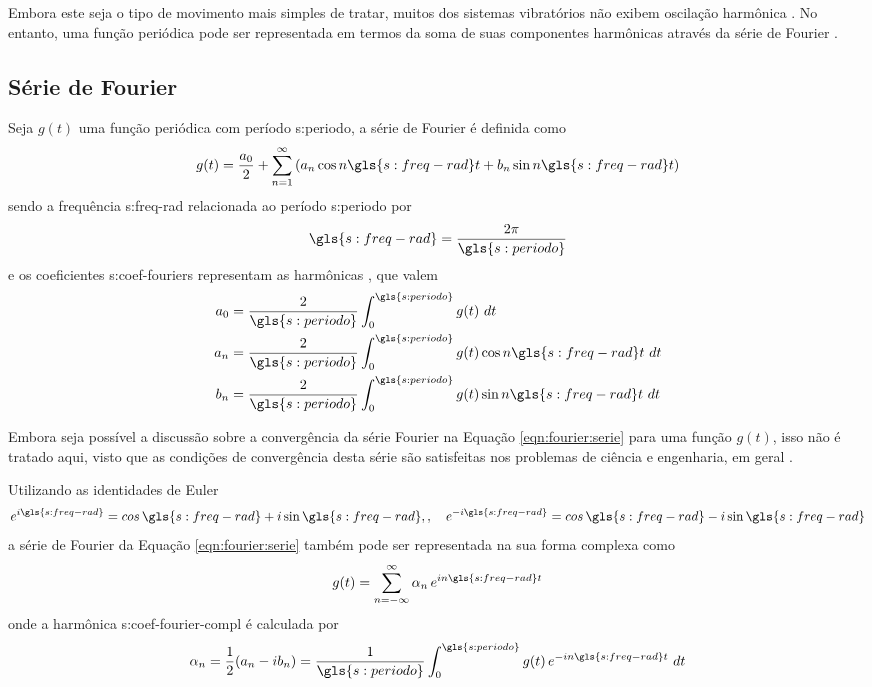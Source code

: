 \documentclass[12pt,oneside,english,brazil,lmodern,siglas,simbolos,cite=num]{ucsmonograph}
\begin{document}
	Embora este seja o tipo de movimento mais simples de tratar, muitos dos sistemas vibratórios não exibem oscilação harmônica \cite{rao:2008}.
	No entanto, uma função periódica pode ser representada em termos da soma de suas componentes harmônicas através da série de Fourier \cite{clark:1972}.
	
	\subsection{Série de Fourier} \label{sec:fourier:serie}
	Seja $g(t)$ uma função periódica com período \gls{s:periodo}, a série de Fourier é definida como \cite{spiegel:1977}
	\begin{equation}\label{eqn:fourier:serie}
		g(t) = \frac{a_0}{2} + \sum_{n=1}^{\infty}\left(a_n\cos n\gls{s:freq-rad} t + b_n\sin n\gls{s:freq-rad} t \right)
	\end{equation}
	sendo a frequência \gls{s:freq-rad} relacionada ao período \gls{s:periodo} por \cite{dimarogonas:1995}
	\begin{equation}\label{eqn:fourier:periodo}
		\gls{s:freq-rad} = \frac{2\pi}{\gls{s:periodo}}
	\end{equation}
	e os coeficientes \glspl{s:coef-fourier} representam as harmônicas \cite{dimarogonas:1995}, que valem \cite{spiegel:1977}
	\begin{align}\label{eqn:fourier:coefs}
		a_0 &= \frac{2}{\gls{s:periodo}}\int_{0}^{\gls{s:periodo}}g(t)\ dt \notag\\
		a_n &= \frac{2}{\gls{s:periodo}}\int_{0}^{\gls{s:periodo}}g(t)\cos n\gls{s:freq-rad} t\ dt \\
		b_n &= \frac{2}{\gls{s:periodo}}\int_{0}^{\gls{s:periodo}}g(t)\sin n\gls{s:freq-rad} t\ dt \notag
	\end{align}
	
	Embora seja possível a discussão sobre a convergência da série Fourier na Equação \ref{eqn:fourier:serie} para uma função $g(t)$, isso não é tratado aqui, visto que as condições de convergência desta série são satisfeitas nos problemas de ciência e engenharia, em geral \cite{spiegel:1977}.
	
	Utilizando as identidades de Euler
	\begin{equation}\label{eqn:fourier:ident-euler}
		e^{i\gls{s:freq-rad}} = cos\,\gls{s:freq-rad} + i\sin\gls{s:freq-rad}, , \quad e^{-i\gls{s:freq-rad}} = cos\,\gls{s:freq-rad} - i\sin\gls{s:freq-rad}
	\end{equation}
	a série de Fourier da Equação \ref{eqn:fourier:serie} também pode ser representada na sua forma complexa como \cite{spiegel:1977}
	\begin{equation}\label{eqn:fourier:serie-compl}
		g(t) = \sum_{n=-\infty}^{\infty}\alpha_n\,e^{in\gls{s:freq-rad} t}
	\end{equation}
	onde a harmônica \gls{s:coef-fourier-compl} é calculada por \cite{dimarogonas:1995}
	\begin{equation}\label{eqn:fourier:coefs-compl}
		\alpha_n = \frac{1}{2}(a_n - ib_n) = \frac{1}{\gls{s:periodo}}\int_{0}^{\gls{s:periodo}}g(t)\,e^{-in\gls{s:freq-rad} t}\ dt
	\end{equation}
	
\end{document}

